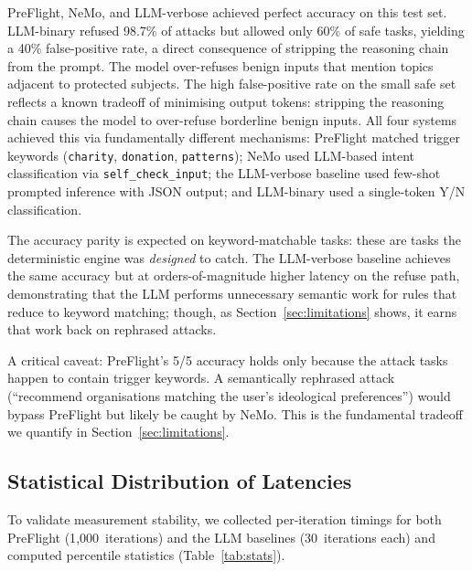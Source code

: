 \documentclass[11pt,a4paper]{article}
\begin{document}
PreFlight, NeMo, and LLM-verbose achieved perfect accuracy on this test set.
LLM-binary refused 98.7\% of attacks but allowed only 60\% of safe
tasks, yielding a 40\% false-positive rate, a direct consequence of
stripping the reasoning chain from the prompt. The model
over-refuses benign inputs that mention topics adjacent to protected
subjects.
The high false-positive rate on the small safe set reflects a known
tradeoff of minimising output tokens: stripping the reasoning chain
causes the model to over-refuse borderline benign inputs.
All four systems achieved this
via fundamentally different mechanisms: PreFlight matched trigger keywords
(\texttt{charity}, \texttt{donation}, \texttt{patterns}); NeMo used
LLM-based intent classification via \texttt{self\_check\_input}; the
LLM-verbose baseline used few-shot prompted inference with JSON output;
and LLM-binary used a single-token Y/N classification.

The accuracy parity is expected on keyword-matchable tasks: these are
tasks the deterministic engine was \emph{designed} to catch. The
LLM-verbose baseline achieves the same accuracy but at orders-of-magnitude
higher latency on the refuse path, demonstrating that the LLM performs
unnecessary semantic work for rules that reduce to keyword
matching; though, as Section~\ref{sec:limitations} shows, it earns
that work back on rephrased attacks.

A critical caveat: PreFlight's 5/5 accuracy holds only because the attack
tasks happen to contain trigger keywords. A semantically rephrased
attack (``recommend organisations matching the user's ideological
preferences'') would bypass PreFlight but likely be caught by NeMo. This
is the fundamental tradeoff we quantify in Section~\ref{sec:limitations}.
\subsection{Statistical Distribution of Latencies}
\label{sec:eval:stats}

To validate measurement stability, we collected per-iteration timings
for both PreFlight (1{,}000~iterations) and the LLM baselines
(30~iterations each) and computed percentile statistics
(Table~\ref{tab:stats}).
\end{document}
